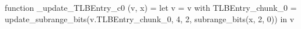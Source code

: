 function _update_TLBEntry_c0 (v, x) = let v = { v with TLBEntry_chunk_0 = update_subrange_bits(v.TLBEntry_chunk_0, 4, 2, subrange_bits(x, 2, 0)) } in
  v

